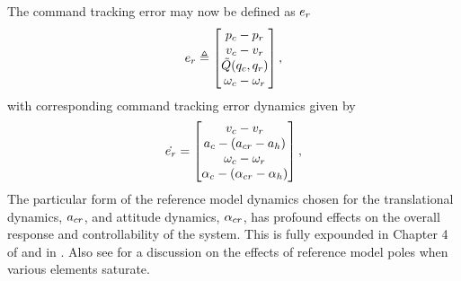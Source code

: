 The command tracking error may now be defined as $e_r$
\begin{equation}
\label{e:er} e_r \triangleq
\begin{bmatrix}
p_c - p_{r} \\
v_c - v_{r} \\
\tilde{Q}(q_c,q_{r}) \\
\omega_c - \omega_{r}
\end{bmatrix},
\end{equation}
with corresponding command tracking error dynamics given by
\begin{equation}
\label{e:edotr} \dot{e_r} =
\begin{bmatrix}
v_c - v_{r} \\
a_c - (a_{cr} - a_{h}) \\
\omega_c - \omega_{r} \\
\alpha_c - (\alpha_{cr} - \alpha_{h})
\end{bmatrix},
\end{equation}
The particular form of the reference model dynamics chosen for the translational dynamics, $a_{cr}$, and attitude dynamics, $\alpha_{cr}$, has profound effects on the overall response and controllability of the system. This is fully expounded in Chapter 4 of \cite{kannan:phd} and in \cite{kannan:cdc:2010b}. Also see \cite{kannan:acc:2003} for a discussion on the effects of reference model poles when various elements saturate.

\begin{comment}
A summary of the options for reference models is given here. A definition is useful at this point.
\begin{definition}
\label{def:nullcontstate} A state $x_0$ is said to be null
controllable in time $T
> 0$ if there exists an admissible control $\delta(t)$ such that the state
trajectory $x(t)$ of the system satisfies $x(0) = x_0$ and $x(T) =
0$. The set of all states that are null controllable in time $T$,
denoted by $\mathcal{C}(T)$, is called the null controllable region
in time $T$. The set of all such $x_0$ for $T\in[0,\infty]$ is call the null controllable region.
\end{definition}

Determining the null controllable region of a system is not trivial.
For linear systems, simple estimates may be found using the Circle
and Popov criteria as described in \cite{khalil:book:1992,pittet:cdc:1997}.
Less conservative estimates may be found as the result of an LMI
optimization as described in \cite{hu:book:2001}. For nonlinear systems of
the form \sys{e:simple:fxu}, there is no known method \cite{sontag:siam:1988,sontag:cdc:1988} to explicitly characterize a null controllable region
$\nulldom{x}$ where there always exists an admissible control which
can bring an initial state $x(0)$ back to the origin in finite time.
\end{comment}

